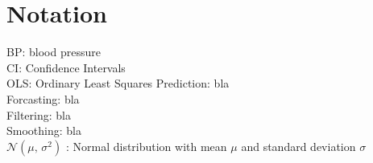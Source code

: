 \chapter*{Notation}
\label{c:Notation}

BP: blood pressure \\
CI: Confidence Intervals\\
OLS: Ordinary Least Squares
Prediction: bla \\
Forcasting: bla \\
Filtering: bla \\
Smoothing: bla \\



$\mathcal{N}(\mu,\,\sigma^{2})$ : Normal distribution with mean $\mu$ and standard deviation $\sigma$



